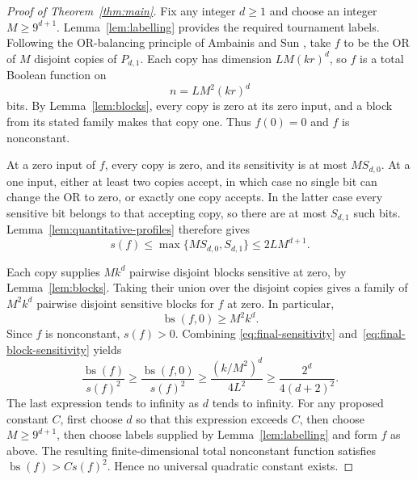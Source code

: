 \documentclass[11pt]{article}
\newcommand{\bs}{\operatorname{bs}}
\theoremstyle{definition}
\theoremstyle{remark}
\begin{document}
\begin{proof}[Proof of Theorem~\ref{thm:main}]
Fix any integer $d\geq1$ and choose an integer $M\geq9^{d+1}$.
Lemma~\ref{lem:labelling} provides the required tournament labels.
Following the OR-balancing principle of Ambainis and Sun
\cite[Section~4, Lemma~1]{AmbainisSun2011}, take $f$ to be the OR of $M$
disjoint copies of $P_{d,1}$.
Each copy has dimension $LM(kr)^d$, so $f$ is a total Boolean function on
\begin{equation}
\label{eq:final-dimension}
 n=LM^2(kr)^d
\end{equation}
bits. By Lemma~\ref{lem:blocks}, every copy is zero at its zero input,
and a block from its stated family makes that copy one.
Thus $f(0)=0$ and $f$ is nonconstant.

At a zero input of $f$, every copy is zero, and its sensitivity is at most
$M S_{d,0}$. At a one input, either at least two copies accept, in which
case no single bit can change the OR to zero, or exactly one copy accepts.
In the latter case every sensitive bit belongs to that accepting copy,
so there are at most $S_{d,1}$ such bits.
Lemma~\ref{lem:quantitative-profiles} therefore gives
\begin{equation}
\label{eq:final-sensitivity}
 s(f)\leq\max\{M S_{d,0},S_{d,1}\}
       \leq2L M^{d+1}.
\end{equation}

Each copy supplies $M k^d$ pairwise disjoint blocks sensitive at zero,
by Lemma~\ref{lem:blocks}. Taking their union over the disjoint copies
gives a family of $M^2k^d$ pairwise disjoint sensitive blocks for $f$ at zero.
In particular,
\begin{equation}
\label{eq:final-block-sensitivity}
 \bs(f,0)\geq M^2k^d.
\end{equation}
Since $f$ is nonconstant, $s(f)>0$. Combining
\eqref{eq:final-sensitivity} and~\eqref{eq:final-block-sensitivity} yields
\begin{equation}
\label{eq:ratio-separation}
 \frac{\bs(f)}{s(f)^2}
 \geq\frac{\bs(f,0)}{s(f)^2}
 \geq\frac{(k/M^2)^d}{4L^2}
 \geq\frac{2^d}{4(d+2)^2}.
\end{equation}
The last expression tends to infinity as $d$ tends to infinity.
For any proposed constant $C$, first choose $d$ so that this expression
exceeds $C$, then choose $M\geq9^{d+1}$, then choose labels supplied by
Lemma~\ref{lem:labelling} and form $f$ as above.
The resulting finite-dimensional total nonconstant function satisfies
$\bs(f)>C s(f)^2$. Hence no universal quadratic constant exists.
\end{proof}
\end{document}
